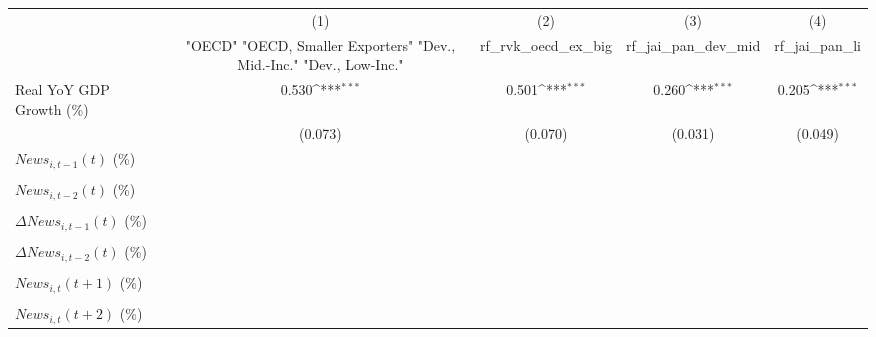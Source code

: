 {
\def\sym#1{\ifmmode^{#1}\else\(^{#1}\)\fi}
\begin{tabular}{l*{4}{c}}
\toprule
                    &\multicolumn{1}{c}{(1)}&\multicolumn{1}{c}{(2)}&\multicolumn{1}{c}{(3)}&\multicolumn{1}{c}{(4)}\\
                    &\multicolumn{1}{c}{ "OECD" "OECD, Smaller Exporters" "Dev., Mid.-Inc." "Dev., Low-Inc."}&\multicolumn{1}{c}{rf_rvk_oecd_ex_big}&\multicolumn{1}{c}{rf_jai_pan_dev_mid}&\multicolumn{1}{c}{rf_jai_pan_li}\\
\midrule
Real YoY GDP Growth (\%)&       0.530\sym{***}&       0.501\sym{***}&       0.260\sym{***}&       0.205\sym{***}\\
                    &     (0.073)         &     (0.070)         &     (0.031)         &     (0.049)         \\
\addlinespace
$ News_{i,t-1}(t)$ (\%)&                     &                     &                     &                     \\
                    &                     &                     &                     &                     \\
\addlinespace
$ News_{i,t-2}(t)$ (\%)&                     &                     &                     &                     \\
                    &                     &                     &                     &                     \\
\addlinespace
$ \Delta News_{i,t-1}(t)$ (\%)&                     &                     &                     &                     \\
                    &                     &                     &                     &                     \\
\addlinespace
$ \Delta News_{i,t-2}(t)$ (\%)&                     &                     &                     &                     \\
                    &                     &                     &                     &                     \\
\addlinespace
$ News_{i,t}(t+1)$ (\%)&                     &                     &                     &                     \\
                    &                     &                     &                     &                     \\
\addlinespace
$ News_{i,t}(t+2)$ (\%)&                     &                     &                     &                     \\

\end{tabular}}
